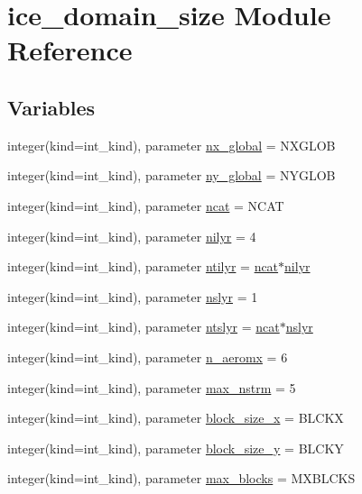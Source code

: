\hypertarget{namespaceice__domain__size}{
\section{ice\_\-domain\_\-size Module Reference}
\label{namespaceice__domain__size}
}
\subsection*{Variables}
\begin{DoxyCompactItemize}
\item 
integer(kind=int\_\-kind), parameter \hyperlink{namespaceice__domain__size_aefcbe884e789decfd40a43558e59ce6f}{nx\_\-global} = NXGLOB
\item 
integer(kind=int\_\-kind), parameter \hyperlink{namespaceice__domain__size_ae668c8c91f91c2a63ce14581f198e1af}{ny\_\-global} = NYGLOB
\item 
integer(kind=int\_\-kind), parameter \hyperlink{namespaceice__domain__size_af6426e75baee1427e99bac2564d5afd7}{ncat} = NCAT
\item 
integer(kind=int\_\-kind), parameter \hyperlink{namespaceice__domain__size_a5c1a0b8bcf4dc16b485be17beea4f6bf}{nilyr} = 4
\item 
integer(kind=int\_\-kind), parameter \hyperlink{namespaceice__domain__size_a46a923e86a6a0f553260f445f9faf5c9}{ntilyr} = \hyperlink{namespaceice__domain__size_af6426e75baee1427e99bac2564d5afd7}{ncat}$\ast$\hyperlink{namespaceice__domain__size_a5c1a0b8bcf4dc16b485be17beea4f6bf}{nilyr}
\item 
integer(kind=int\_\-kind), parameter \hyperlink{namespaceice__domain__size_aa5abf2eae8654b241bf06dac90d70c6b}{nslyr} = 1
\item 
integer(kind=int\_\-kind), parameter \hyperlink{namespaceice__domain__size_a2b95950726524c87034f6468ba946b2a}{ntslyr} = \hyperlink{namespaceice__domain__size_af6426e75baee1427e99bac2564d5afd7}{ncat}$\ast$\hyperlink{namespaceice__domain__size_aa5abf2eae8654b241bf06dac90d70c6b}{nslyr}
\item 
integer(kind=int\_\-kind), parameter \hyperlink{namespaceice__domain__size_a61a60feb03a21a007ce6e62858188393}{n\_\-aeromx} = 6
\item 
integer(kind=int\_\-kind), parameter \hyperlink{namespaceice__domain__size_a5b7e71626d60541574b8431d717d2c42}{max\_\-nstrm} = 5
\item 
integer(kind=int\_\-kind), parameter \hyperlink{namespaceice__domain__size_a6e6f2cb739480c307cb4a416f6cde96f}{block\_\-size\_\-x} = BLCKX
\item 
integer(kind=int\_\-kind), parameter \hyperlink{namespaceice__domain__size_a7b805f9f706b3843b3b4da02974a2654}{block\_\-size\_\-y} = BLCKY
\item 
integer(kind=int\_\-kind), parameter \hyperlink{namespaceice__domain__size_abb7c0f274dd4e8ef1b66bc8785478941}{max\_\-blocks} = MXBLCKS
\end{DoxyCompactItemize}


